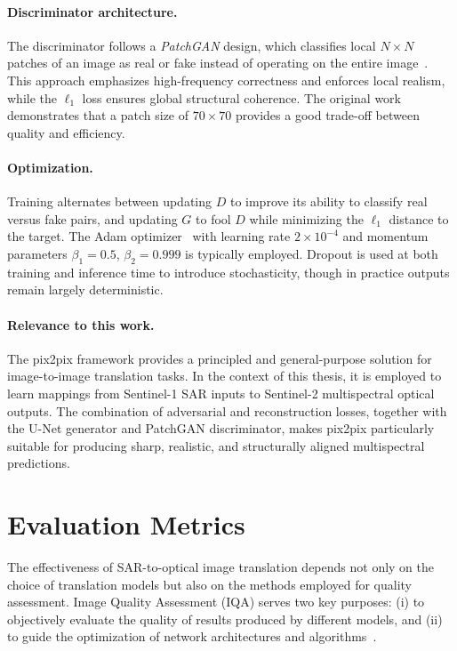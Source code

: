 \paragraph{Discriminator architecture.}  
The discriminator follows a \textit{PatchGAN} design, which classifies local $N \times N$ patches of an image as real or fake instead of operating on the entire image~\cite{pix2pix_2018}. This approach emphasizes high-frequency correctness and enforces local realism, while the $\ell_1$ loss ensures global structural coherence. The original work demonstrates that a patch size of $70 \times 70$ provides a good trade-off between quality and efficiency.

\paragraph{Optimization.}  
Training alternates between updating $D$ to improve its ability to classify real versus fake pairs, and updating $G$ to fool $D$ while minimizing the $\ell_1$ distance to the target. The Adam optimizer~\cite{adam_optimizer_2017} with learning rate $2 \times 10^{-4}$ and momentum parameters $\beta_1=0.5$, $\beta_2=0.999$ is typically employed. Dropout is used at both training and inference time to introduce stochasticity, though in practice outputs remain largely deterministic.

\paragraph{Relevance to this work.}  
The pix2pix framework provides a principled and general-purpose solution for image-to-image translation tasks. In the context of this thesis, it is employed to learn mappings from Sentinel-1 SAR inputs to Sentinel-2 multispectral optical outputs. The combination of adversarial and reconstruction losses, together with the U-Net generator and PatchGAN discriminator, makes pix2pix particularly suitable for producing sharp, realistic, and structurally aligned multispectral predictions.


\section{Evaluation Metrics}
The effectiveness of SAR-to-optical image translation depends not only on the choice of translation models but also on the methods employed for quality assessment. Image Quality Assessment (IQA) serves two key purposes: (i) to objectively evaluate the quality of results produced by different models, and (ii) to guide the optimization of network architectures and algorithms~\cite{quality_assessment_S2OT}.


